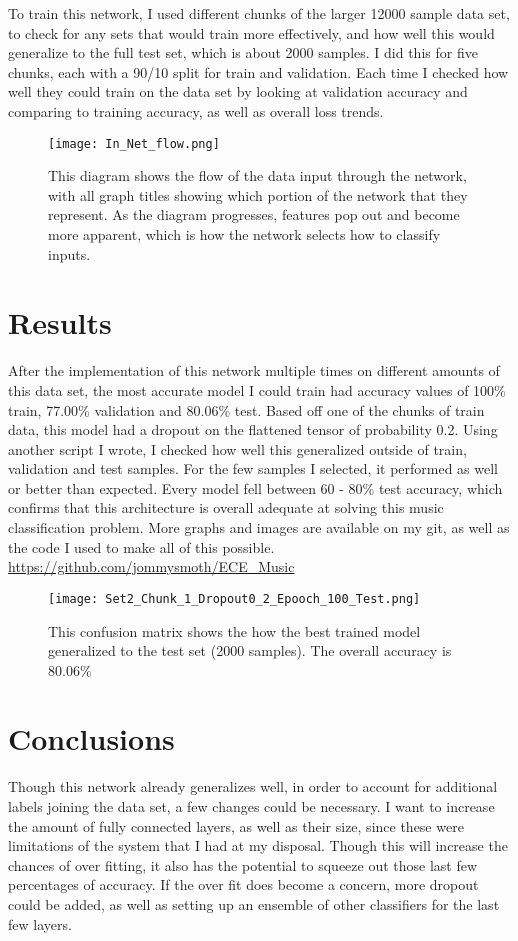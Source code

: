 \documentclass[10pt,twocolumn,letterpaper]{article}
\begin{document}
To train this network, I used different chunks of the larger 12000 sample data set, to check for any sets that would train more effectively, and how well this would generalize to the full test set, which is about 2000 samples. I did this for five chunks, each with a 90/10 split for train and validation. Each time I checked how well they could train on the data set by looking at validation accuracy and comparing to training accuracy, as well as overall loss trends.
\begin{figure}
    \centering
    \texttt{[image: In\_Net\_flow.png]}
  \caption{This diagram shows the flow of the data input through the network, with all graph titles showing which portion of the network that they represent. As the diagram progresses, features pop out and become more apparent, which is how the network selects how to classify inputs.}
\end{figure}
\section{Results}
After the implementation of this network multiple times on different amounts of this data set, the most accurate model I could train had accuracy values of 100\% train, 77.00\% validation and 80.06\% test. Based off one of the chunks of train data, this model had a dropout on the flattened tensor of probability 0.2. Using another script I wrote, I checked how well this generalized outside of train, validation and test samples. For the few samples I selected, it performed as well or better than expected. Every model fell between 60 - 80\% test accuracy, which confirms that this architecture is overall adequate at solving this music classification problem. More graphs and images are available on my git, as well as the code I used to make all of this possible.
\href{https://github.com/jommysmoth/ECE_Music}{https://github.com/jommysmoth/ECE\_Music}
\begin{figure}
    \texttt{[image: Set2\_Chunk\_1\_Dropout0\_2\_Epooch\_100\_Test.png]}
    \caption{This confusion matrix shows the how the best trained model generalized to the test set (2000 samples). The overall accuracy is 80.06\%}
\end{figure}
\section{Conclusions}
Though this network already generalizes well, in order to account for additional labels joining the data set, a few changes could be necessary. I want to increase the amount of fully connected layers, as well as their size, since these were limitations of the system that I had at my disposal. Though this will increase the chances of over fitting, it also has the potential to squeeze out those last few percentages of accuracy. If the over fit does become a concern, more dropout could be added, as well as setting up an ensemble of other classifiers for the last few layers.
\end{document}
